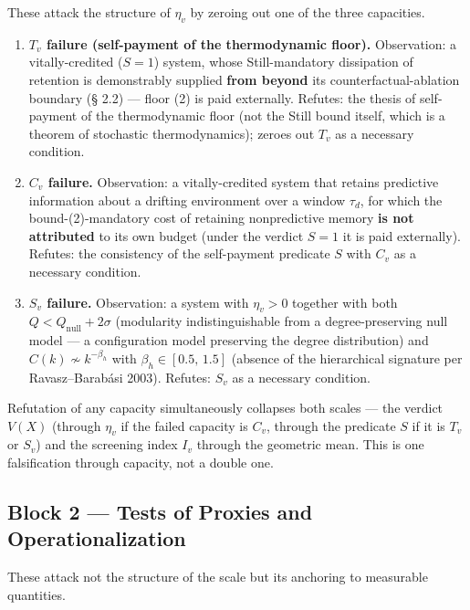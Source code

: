 \documentclass[pdflatex,sn-mathphys-ay]{sn-jnl}
\providecommand{\tightlist}{\setlength{\itemsep}{0pt}\setlength{\parskip}{0pt}}
\begin{document}
These attack the structure of \(\eta_v\) by zeroing out one of the three capacities.

\begin{enumerate}
\def\labelenumi{\arabic{enumi}.}
\tightlist
\item
  \textbf{\(T_v\) failure (self-payment of the thermodynamic floor).} Observation: a vitally-credited (\(S = 1\)) system, whose Still-mandatory dissipation of retention is demonstrably supplied \textbf{from beyond} its counterfactual-ablation boundary (§ 2.2) --- floor (2) is paid externally. Refutes: the thesis of self-payment of the thermodynamic floor (not the Still bound itself, which is a theorem of stochastic thermodynamics); zeroes out \(T_v\) as a necessary condition.
\item
  \textbf{\(C_v\) failure.} Observation: a vitally-credited system that retains predictive information about a drifting environment over a window \(\tau_d\), for which the bound-(2)-mandatory cost of retaining nonpredictive memory \textbf{is not attributed} to its own budget (under the verdict \(S = 1\) it is paid externally). Refutes: the consistency of the self-payment predicate \(S\) with \(C_v\) as a necessary condition.
\item
  \textbf{\(S_v\) failure.} Observation: a system with \(\eta_v > 0\) together with both \(Q < Q_{\text{null}} + 2\sigma\) (modularity indistinguishable from a degree-preserving null model --- a configuration model preserving the degree distribution) and \(C(k) \not\sim k^{-\beta_h}\) with \(\beta_h \in [0.5,\, 1.5]\) (absence of the hierarchical signature per Ravasz--Barabási 2003). Refutes: \(S_v\) as a necessary condition.
\end{enumerate}

Refutation of any capacity simultaneously collapses both scales --- the verdict \(V(X)\) (through \(\eta_v\) if the failed capacity is \(C_v\), through the predicate \(S\) if it is \(T_v\) or \(S_v\)) and the screening index \(I_v\) through the geometric mean. This is one falsification through capacity, not a double one.

\subsection{Block 2 --- Tests of Proxies and Operationalization}\label{block-2-tests-of-proxies-and-operationalization}

These attack not the structure of the scale but its anchoring to measurable quantities.
\end{document}
